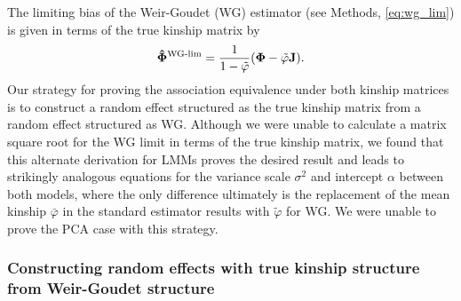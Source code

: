 \documentclass[11pt]{article}
\newcommand{\kinMat}{%
  \ensuremath{%
    \mathbf{\Phi}
  }%
  \xspace%
}%
\newcommand{\kinMatEstNamed}[1]{%
  \ensuremath{%
    \mathbf{\hat{\Phi}}^\text{#1}
  }%
  \xspace%
}%
\newcommand{\kinMatWGLim}{%
  \kinMatEstNamed{WG-lim}
}%
\begin{document}
The limiting bias of the Weir-Goudet (WG) estimator (see Methods, \cref{eq:wg_lim}) is given in terms of the true kinship matrix by
\begin{equation}
  \label{eq:wg_lim_mat}
  \kinMatWGLim
  =
  \frac{1}{1-\tilde{\varphi}}( \kinMat - \tilde{\varphi}\mathbf{J})
  .
\end{equation}
Our strategy for proving the association equivalence under both kinship matrices is to construct a random effect structured as the true kinship matrix from a random effect structured as WG.
Although we were unable to calculate a matrix square root for the WG limit in terms of the true kinship matrix, we found that this alternate derivation for LMMs proves the desired result and leads to strikingly analogous equations for the variance scale $\sigma^2$ and intercept $\alpha$ between both models, where the only difference ultimately is the replacement of the mean kinship $\bar{\varphi}$ in the standard estimator results with $\tilde{\varphi}$ for WG.
We were unable to prove the PCA case with this strategy.

\subsubsection{Constructing random effects with true kinship structure from Weir-Goudet structure}
\end{document}

